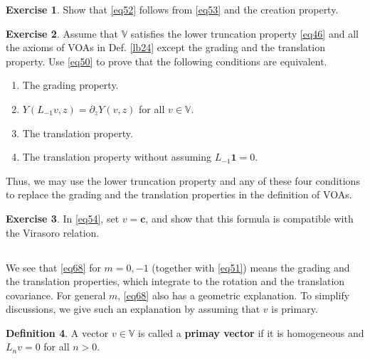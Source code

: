 \documentclass[11pt,b5paper,notitlepage]{article}
\theoremstyle{definition}
\newtheorem{df}{Definition}[section]
\newtheorem{exe}[df]{Exercise}
\theoremstyle{plain}
\newcommand{\id}{\mathbf{1}}
\newcommand{\Vbb}{\mathbb V}
\newcommand{\cbf}{\mathbf c}
\numberwithin{equation}{section}
\begin{document}
\begin{exe}
Show that \eqref{eq52} follows from \eqref{eq53} and the creation property.
\end{exe}



\begin{exe}
Assume that $\Vbb$ satisfies the lower truncation property \eqref{eq46} and all the axioms of VOAs in Def. \ref{lb24} except the grading and the translation property. Use \eqref{eq50} to prove that the following conditions are equivalent.
\begin{enumerate}
	\item The grading property.
	\item $Y(L_{-1}v,z)=\partial_zY(v,z)$ for all $v\in\Vbb$.
	\item The translation property.
	\item The translation property without assuming $L_{-1}\id=0$.
\end{enumerate} 
Thus, we may use the lower truncation property and any of these four conditions to replace the grading and the translation properties in the definition of VOAs.
\end{exe}

\begin{exe}\label{lb37}
In \eqref{eq54}, set $v=\cbf$, and show that this formula is compatible with the Virasoro relation. 
\end{exe}



\subsection{}\label{lb43}

We see that \eqref{eq68} for $m=0,-1$ (together with \eqref{eq51}) means the grading and the translation properties, which integrate to the rotation and the translation covariance. For general $m$, \eqref{eq68} also has a geometric explanation. To simplify discussions, we give such an explanation by assuming that $v$ is primary.

\begin{df}
A vector $v\in\Vbb$ is called a \textbf{primay vector} if it is homogeneous and $L_nv=0$ for all $n>0$.
\end{df}
\end{document}
